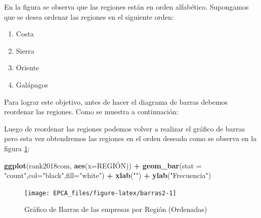 \documentclass[letterpaper,]{book}
\newenvironment{Shaded}{\begin{snugshade}}{\end{snugshade}}
\newcommand{\DataTypeTok}[1]{\textcolor[rgb]{0.13,0.29,0.53}{#1}}
\newcommand{\KeywordTok}[1]{\textcolor[rgb]{0.13,0.29,0.53}{\textbf{#1}}}
\newcommand{\NormalTok}[1]{#1}
\newcommand{\OperatorTok}[1]{\textcolor[rgb]{0.81,0.36,0.00}{\textbf{#1}}}
\newcommand{\StringTok}[1]{\textcolor[rgb]{0.31,0.60,0.02}{#1}}
\providecommand{\tightlist}{%
  \setlength{\itemsep}{0pt}\setlength{\parskip}{0pt}}
\begin{document}
En la figura se observa que las regiones están en orden alfabético. Supongamos que se desea ordenar las regiones en el siguiente orden:

\begin{enumerate}
\def\labelenumi{\arabic{enumi}.}
\tightlist
\item
  Costa
\item
  Sierra
\item
  Oriente
\item
  Galápagos
\end{enumerate}

Para lograr este objetivo, antes de hacer el diagrama de barras debemos reordenar las regiones. Como se muestra a continuación:

\begin{Shaded}
\end{Shaded}

Luego de reordenar las regiones podemos volver a realizar el gráfico de barras pero esta vez obtendremos las regiones en el orden deseado como se observa en la figura \ref{fig:barras2}:

\begin{Shaded}
\begin{Highlighting}[]
\KeywordTok{ggplot}\NormalTok{(rank2018com, }\KeywordTok{aes}\NormalTok{(}\DataTypeTok{x=}\NormalTok{REGIÓN)) }\OperatorTok{+}\StringTok{ }
\StringTok{  }\KeywordTok{geom_bar}\NormalTok{(}\DataTypeTok{stat =} \StringTok{"count"}\NormalTok{,}\DataTypeTok{col=}\StringTok{"black"}\NormalTok{,}\DataTypeTok{fill=}\StringTok{"white"}\NormalTok{) }\OperatorTok{+}
\StringTok{  }\KeywordTok{xlab}\NormalTok{(}\StringTok{""}\NormalTok{) }\OperatorTok{+}\StringTok{ }\KeywordTok{ylab}\NormalTok{(}\StringTok{"Frecuencia"}\NormalTok{)}
\end{Highlighting}
\end{Shaded}

\begin{figure}[h!]

{\centering \texttt{[image: EPCA\_files/figure-latex/barras2-1]} 

}

\caption{Gráfico de Barras de las empresas por Región (Ordenadas)}\label{fig:barras2}
\end{figure}
\end{document}

